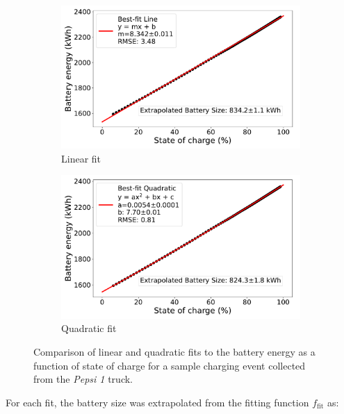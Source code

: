 \begin{figure}[H]
    \centering
    \begin{subfigure}[b]{0.48\textwidth}
        \centering
        \includegraphics[width=\textwidth]{figures/pepsi_1_battery_soc_vs_energy_event_11_linearfit.pdf}
        \caption{Linear fit}
        \label{fig:charging_linear_fit}
    \end{subfigure}
    \hfill
    \begin{subfigure}[b]{0.48\textwidth}
        \centering
        \includegraphics[width=\textwidth]{figures/pepsi_1_battery_soc_vs_energy_event_11_quadfit.pdf}
        \caption{Quadratic fit}
        \label{fig:charging_quad_fit}
    \end{subfigure}
    \caption{Comparison of linear and quadratic fits to the battery energy as a function of state of charge for a sample charging event collected from the \textit{Pepsi 1} truck.}
    \label{fig:charging_fits}
\end{figure}

For each fit, the battery size was extrapolated from the fitting function $f_\text{fit}$ as:

